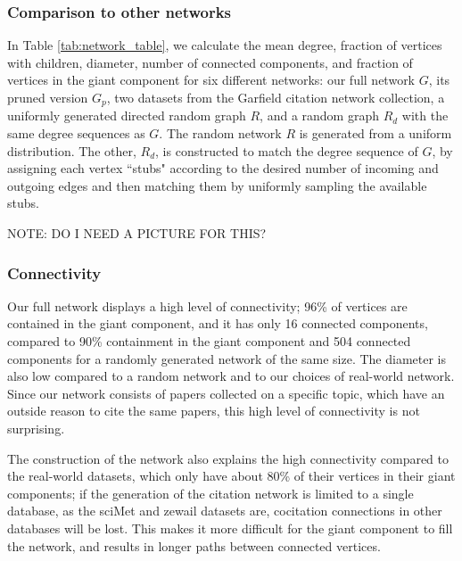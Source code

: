 \documentclass[12pt]{thesis}
\theoremstyle{plain}
\theoremstyle{definition}
\theoremstyle{remark}
\begin{document}
\subsubsection{Comparison to other networks}
In Table \ref{tab:network_table}, we calculate the mean degree, fraction of vertices with children, diameter, number of connected components, and fraction of vertices in the giant component for six different networks: our full network $G$, its pruned version $G_p$, two datasets from the Garfield citation network collection, a uniformly generated directed random graph $R$, and a random graph $R_d$ with the same degree sequences as $G$. The random network $R$ is generated from a uniform distribution. The other, $R_d$, is constructed to match the degree sequence of $G$, by assigning each vertex ``stubs" according to the desired number of incoming and outgoing edges and then matching them by uniformly sampling the available stubs.

NOTE: DO I NEED A PICTURE FOR THIS?


\subsubsection{Connectivity}

Our full network displays a high level of connectivity; 96\% of vertices are contained in the giant component, and it has only 16 connected components, compared to 90\% containment in the giant component and 504 connected components for a randomly generated network of the same size. The diameter is also low compared to a random network and to our choices of real-world network. Since our network consists of papers collected on a specific topic, which have an outside reason to cite the same papers, this high level of connectivity is not surprising. 

The construction of the network also explains the high connectivity compared to the real-world datasets, which only have about 80\% of their vertices in their giant components; if the generation of the citation network is limited to a single database, as the sciMet and zewail datasets are, cocitation connections in other databases will be lost. This makes it more difficult for the giant component to fill the network, and results in longer paths between connected vertices.
\end{document}
